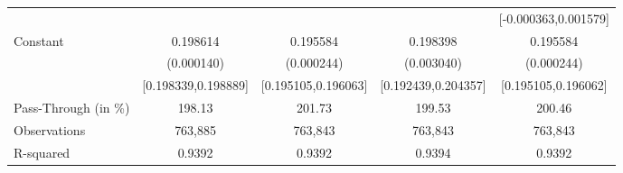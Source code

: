 {\begin{tabular}{l*{4}{c}}
                    &                     &                     &                     &[-0.000363,0.001579]         \\
Constant            &    0.198614\sym{***}&    0.195584\sym{***}&    0.198398\sym{***}&    0.195584\sym{***}\\
                    &  (0.000140)         &  (0.000244)         &  (0.003040)         &  (0.000244)         \\
                    &[0.198339,0.198889]         &[0.195105,0.196063]         &[0.192439,0.204357]         &[0.195105,0.196062]         \\
\midrule
Pass-Through (in \%)&      198.13         &      201.73         &      199.53         &      200.46         \\
Observations        &     763,885         &     763,843         &     763,843         &     763,843         \\
R-squared           &      0.9392         &      0.9392         &      0.9394         &      0.9392         \\
\bottomrule
\end{tabular}
}
